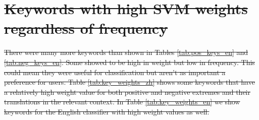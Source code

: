\documentclass[smallextended,natbib]{svjour3}       %
\providecommand{\DIFdel}[1]{{\protect\color{red}\sout{#1}}}                      %
\begin{document}
\section{\DIFdel{Keywords with high SVM weights regardless of frequency}}%
\addtocounter{section}{-1}%

\DIFdel{There were many more keywords than shown in Tables \ref{tab:pos_keys_en} and \ref{tab:neg_keys_en}. Some showed to be high in weight but low in frequency. This could mean they were useful for classification but aren't as important a preference for users. Table \ref{tab:key_weights_zh} shows some keywords that have a relatively high weight value for both positive and negative extremes and their translations in the relevant context. In Table \ref{tab:key_weights_en} we show keywords for the English classifier with high weight values as well.
}%
\end{document}
